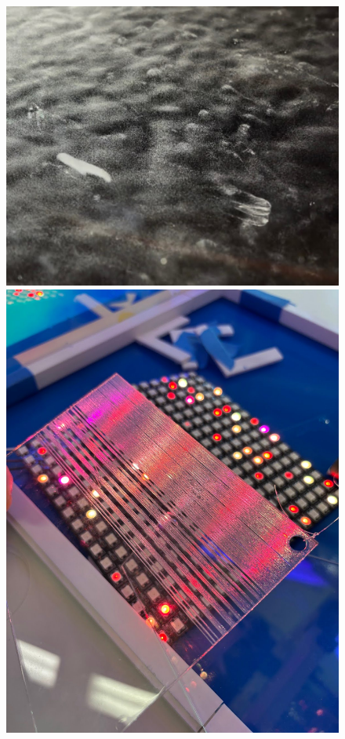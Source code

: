 \documentclass{article}
\begin{document}
\begin{figure} [h]
  \hfill
  \begin{minipage}[b]{0.25\textwidth}
    \includegraphics[width=\textwidth]{images/unnamed8.jpg}
  \end{minipage}
  \hfill
  \begin{minipage}[b]{0.25\textwidth}
    \includegraphics[width=\textwidth]{images/unnamed9.jpg}
  \end{minipage}
\end{figure}
\end{document}
